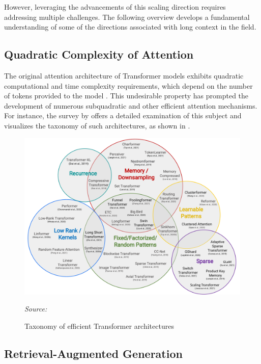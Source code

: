 However, leveraging the advancements of this scaling direction requires addressing multiple challenges. The following overview develops a fundamental understanding of some of the directions associated with long context in the field.

\subsection{Quadratic Complexity of Attention}

The original attention architecture of Transformer models exhibits quadratic computational and time complexity requirements, which depend on the number of tokens provided to the model \parencite{vaswani2017}. This undesirable property has prompted the development of numerous subquadratic and other efficient attention mechanisms. For instance, the survey by \citet{tay2022} offers a detailed examination of this subject and visualizes the taxonomy of such architectures, as shown in .

\begin{figure}[ht]
    \centering
    \includegraphics[width=\textwidth]{figures/taxonomy-of-transformers.pdf}
    \caption{Taxonomy of efficient Transformer architectures}\label{fig:taxonomy-of-transformers}
    \hfill\textit{Source: \citet{tay2022}}
\end{figure}

\subsection{Retrieval-Augmented Generation}


